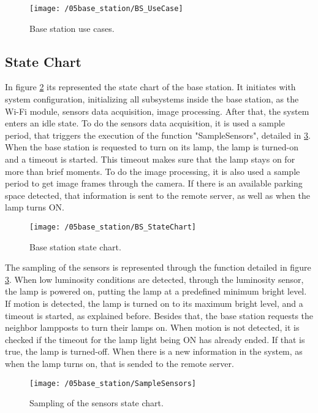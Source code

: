 \begin{figure}[ht] 
	\centering
	\texttt{[image: /05base\_station/BS\_UseCase]}
	\caption{Base station use cases.}
	\label{fig:bs_use_cases}
\end{figure}

\subsection{State Chart}
In figure \ref{fig:bs_state_chart} its represented the state chart of the base station. It initiates with system configuration, initializing all subsystems inside the base station, as the Wi-Fi module, sensors data acquisition, image processing. After that, the system enters an idle state. To do the sensors data acquisition, it is used a sample period, that triggers the execution of the function "SampleSensors", detailed in \ref{fig:sample_sensors}. When the base station is requested to turn on its lamp, the lamp is turned-on and a timeout is started. This timeout makes sure that the lamp stays on for more than brief moments. To do the image processing, it is also used a sample period to get image frames through the camera. If there is an available parking space detected, that information is sent to the remote server, as well as when the lamp turns ON.

\begin{figure}[ht]
	\centering
	\texttt{[image: /05base\_station/BS\_StateChart]}
	\caption{Base station state chart.}
	\label{fig:bs_state_chart}
\end{figure}

\clearpage
The sampling of the sensors is represented through the function detailed in figure \ref{fig:sample_sensors}. When low luminosity conditions are detected, through the luminosity sensor, the lamp is powered on, putting the lamp at a predefined minimum bright level. If motion is detected, the lamp is turned on to its maximum bright level, and a timeout is started, as explained before. Besides that, the base station requests the neighbor lampposts to turn their lamps on. When motion is not detected, it is checked if the timeout for the lamp light being ON has already ended. If that is true, the lamp is turned-off. When there is a new information in the system, as when the lamp turns on, that is sended to the remote server.

\begin{figure}[ht]
	\centering
	\texttt{[image: /05base\_station/SampleSensors]}
	\caption{Sampling of the sensors state chart.}
	\label{fig:sample_sensors}
\end{figure}

